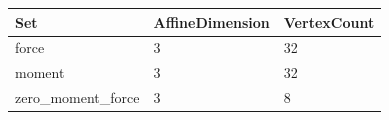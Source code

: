 \begin{tabular}{@{}lll@{}}
\toprule
Set & AffineDimension & VertexCount \\
\midrule
force & 3 & 32 \\
moment & 3 & 32 \\
zero\_moment\_force & 3 & 8 \\
\bottomrule
\end{tabular}
